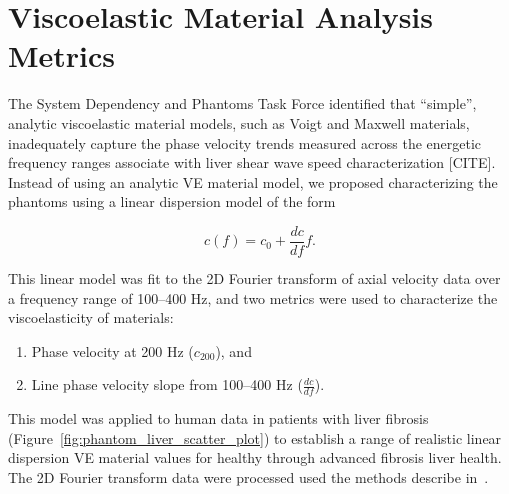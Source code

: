 \section{Viscoelastic Material Analysis Metrics}\label{sect:ve_analysis}

The System Dependency and Phantoms Task Force identified that ``simple'',
analytic viscoelastic material models, such as Voigt and Maxwell materials,
inadequately capture the phase velocity trends measured across the energetic
frequency ranges associate with liver shear wave speed characterization [CITE].
Instead of using an analytic VE material model, we proposed characterizing the
phantoms using a linear dispersion model of the form

\begin{equation}
c(f) = c_0 + \frac{dc}{df} f.
\end{equation}

This linear model was fit to the 2D Fourier transform of axial velocity data
over a frequency range of 100--400 Hz, and two metrics were used to
characterize the viscoelasticity of materials:

\begin{enumerate}
    \item Phase velocity at 200 Hz ($c_{200}$), and
    \item Line phase velocity slope from 100--400 Hz ($\frac{dc}{df}$).
\end{enumerate}

This model was applied to human data in patients with liver
fibrosis~\cite{Palmeri2011} (Figure~\ref{fig:phantom_liver_scatter_plot}) to
establish a range of realistic linear dispersion VE material values for healthy
through advanced fibrosis liver health.  The 2D Fourier transform data were
processed used the methods describe in~\cite{Nightingale2015}.








